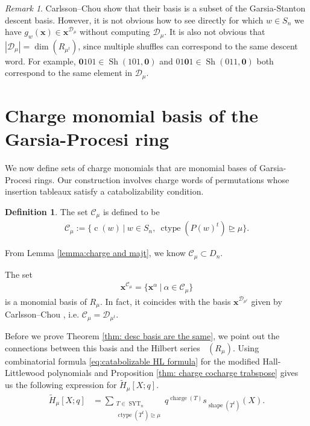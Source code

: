 \documentclass[10pt]{amsart}
\theoremstyle{plain}
\theoremstyle{definition}
\newtheorem{defi}[defi]{Definition}
\theoremstyle{plain}
\theoremstyle{plain}
\theoremstyle{remark}
\newtheorem{rema}[rema]{Remark}
\theoremstyle{plain}
\theoremstyle{plain}
\DeclareMathOperator{\charge}{charge}
\DeclareMathOperator{\syt}{SYT}
\DeclareMathOperator{\ctype}{ctype}
\DeclareMathOperator{\Hilb}{Hilb}
\DeclareMathOperator{\sh}{Sh}
\DeclareMathOperator{\shape}{shape}
\DeclareMathOperator{\cw}{c}
\DeclareMathOperator{\Hilbq}{\Hilb_q}
\newcommand{\mHL}{\tilde{H}}
\begin{document}
\begin{rema}
    Carlsson--Chou show that their basis is a subset of the Garsia-Stanton descent basis. 
However, it is not obvious how to see directly for which $w\in S_n$ we have $g_w(\mathbf{x}) \in \mathbf{x}^{\mathcal{D}_{\mu}}$ without computing $\mathcal{D}_\mu$.
It is also not obvious that $|\mathcal{D}_{\mu}| = \dim(R_{\mu^t})$, since multiple shuffles can correspond to the same descent word. For example, $\mathbf{0}101 \in \sh(101,\mathbf{0})$ and $01\mathbf{0}1 \in \sh(011,\mathbf{0})$ both correspond to the same element in $\mathcal{D}_{\mu}$.

\end{rema}

\section{Charge monomial basis of the Garsia-Procesi ring}\label{section:descent basis}
We now define sets of charge monomials that are monomial bases of Garsia-Procesi rings.
Our construction involves charge words of permutations whose insertion tableaux satisfy a catabolizability condition.

\begin{defi}
    The set $\mathcal{C}_\mu$ is defined to be
\begin{align}\label{def:C_mu}
    \mathcal{C}_\mu := \{\cw(w)\ | \ w\in S_n, \  \ctype(P(w) ^t)\unrhd\mu\}.
\end{align}
\end{defi}

From Lemma \ref{lemma:charge and majt}, we know $\mathcal{C}_\mu\subset D_n$.

\begin{thm1}
\makeatletter{}\makeatother
\label{thm: desc basis are the same} 
    The set 
    \begin{align}\label{eq: our basis}
        \mathbf{x}^{\mathcal{C}_\mu} = \{\mathbf{x}^\alpha \ | \ \alpha \in \mathcal{C}_\mu\}
    \end{align}
     is a monomial basis of $R_{\mu}$. 
       In fact, it coincides with the basis $  \mathbf{x}^{\mathcal{D}_{\mu^t}}$ given by Carlsson--Chou \cite{CC}, i.e. $\mathcal{C}_\mu = \mathcal{D}_{\mu^t}$.
\end{thm1}

Before we prove Theorem \ref{thm: desc basis are the same}, we point out the connections between this basis and the Hilbert series $\Hilbq(R_{\mu})$.
Using combinatorial formula \eqref{eq:catabolizable HL formula} for the modified Hall-Littlewood polynomials and Proposition \ref{thm: charge cocharge trabspose} gives us the following expression for $\mHL_{\mu}[X;q]$.
\begin{align}
    \mHL_{\mu} [X;q] &=  \sum\limits_{\substack{T\in \syt_n\\  \ctype(T^t)\unrhd\mu}}  q^{\charge(T)} s_{\shape(T^t)}(X).
\end{align}
\end{document}
